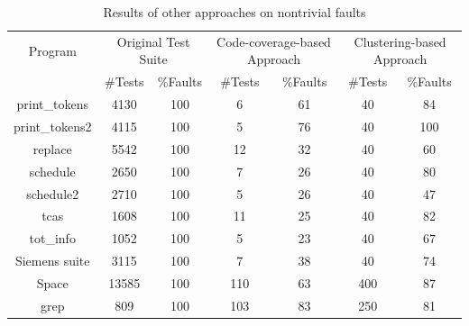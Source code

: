 \documentclass{sig-alternate}
\begin{document}
\begin{table}[htbp]
\caption{Results of other approaches on nontrivial
faults}\label{tab:other:nontrivial} \center
\begin{tabular}{|c|c|c|c|c|c|c|}

\hline Program   & \multicolumn{2}{c}{Original Test Suite} \vline &
\multicolumn{2}{c}{Code-coverage-based Approach} \vline &
\multicolumn{2}{c}{Clustering-based Approach} \vline     \\



 \cline{2-7}  & \#Tests &   \%Faults & \#Tests &   \%Faults &
\#Tests &   \%Faults  \\


\hline  print\_tokens   &   4130    &   100 &   6   &   61  &   40  &   84  \\
\hline  print\_tokens2  &   4115    &   100 &   5   &   76  &   40  &   100 \\
\hline  replace &   5542    &   100 &   12  &   32  &   40  &   60  \\
\hline  schedule    &   2650    &   100 &   7   &   26  &   40  &   80  \\
\hline  schedule2   &   2710    &   100 &   5   &   26  &   40  &   47  \\
\hline  tcas    &   1608    &   100 &   11  &   25  &   40  &   82  \\
\hline  tot\_info &   1052    &   100 &   5   &   23  &   40  &   67  \\
\hline  Siemens suite   &   3115    &   100 &   7   &   38  &   40  &   74  \\
\hline  Space   &   13585   &   100 &   110 &   63  &   400 &   87  \\
\hline  grep    &   809 &   100 &   103 &   83  &   250 &   81  \\

\hline
\end{tabular}
\end{table}
\end{document}
